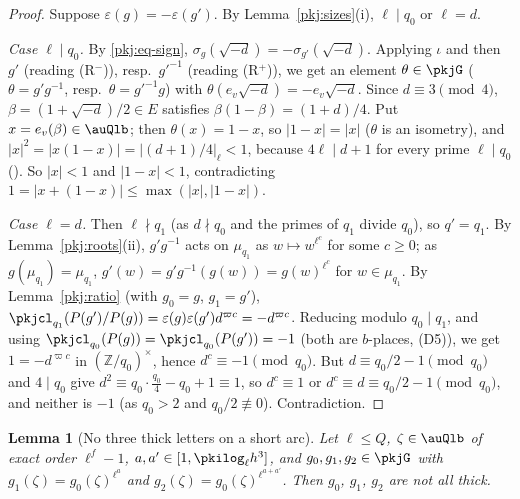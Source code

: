 \documentclass[10pt]{amsart}
\newtheorem{lemma}[theorem]{Lemma}
\theoremstyle{definition}
\theoremstyle{remark}
\newcommand{\Z}{\mathbb Z}
\begin{document}
\begin{proof}
Suppose $\varepsilon(g)=-\varepsilon(g')$. By Lemma~\ref{pkj:sizes}(i), $\ell\mid q_0$ or $\ell=d$.

\emph{Case $\ell\mid q_0$.} By \eqref{pkj:eq-sign}, $\sigma_g(\sqrt{-d})=-\sigma_{g'}(\sqrt{-d})$. Applying
$\iota$ and then $g'$ (reading (R$^-$)), resp.\ $g'^{-1}$ (reading (R$^+$)), we get an element
$\theta\in\pkjG$ ($\theta=g'g^{-1}$, resp.\ $\theta=g'^{-1}g$) with $\theta(e_v\sqrt{-d})=-e_v\sqrt{-d}$. Since $d\equiv3
\pmod4$, $\beta=(1+\sqrt{-d})/2\in E$ satisfies $\beta(1-\beta)=(1+d)/4$. Put $x=e_v(\beta)\in\auQlb$;
then $\theta(x)=1-x$, so $|1-x|=|x|$ ($\theta$ is an isometry), and
$|x|^2=|x(1-x)|=|(d+1)/4|_\ell<1$, because $4\ell\mid d+1$ for every prime $\ell\mid q_0$
({\cite[\S13.1]{P46}}). So $|x|<1$ and $|1-x|<1$, contradicting $1=|x+(1-x)|\le\max(|x|,|1-x|)$.

\emph{Case $\ell=d$.} Then $\ell\nmid q_1$ (as $d\nmid q_0$ and the primes of $q_1$ divide $q_0$), so
$q'=q_1$. By Lemma~\ref{pkj:roots}(ii), $g'g^{-1}$ acts on $\mu_{q_1}$ as $w\mapsto w^{\ell^c}$ for some
$c\ge0$; as $g(\mu_{q_1})=\mu_{q_1}$, $g'(w)=g'g^{-1}(g(w))=g(w)^{\ell^c}$ for $w\in\mu_{q_1}$. By
Lemma~\ref{pkj:ratio} (with $g_0=g$, $g_1=g'$), $\pkjcl_{q_1}(P(g')/P(g))=\varepsilon(g)\varepsilon(g')
d^{\varpi c}=-d^{\varpi c}$. Reducing modulo $q_0\mid q_1$, and using $\pkjcl_{q_0}(P(g))=\pkjcl_{q_0}(P(g'))
=-1$ (both are $b$-places, (D5)), we get $1=-d^{\varpi c}$ in $(\Z/q_0)^\times$, hence $d^{c}\equiv-1
\pmod{q_0}$. But $d\equiv q_0/2-1\pmod{q_0}$ and $4\mid q_0$ give $d^2\equiv q_0\cdot\frac{q_0}4-q_0+1
\equiv1$, so $d^c\equiv1$ or $d^c\equiv d\equiv q_0/2-1\pmod{q_0}$, and neither is $-1$ (as $q_0>2$ and
$q_0/2\not\equiv0$). Contradiction.
\end{proof}

\begin{lemma}[No three thick letters on a short arc]\label{pkj:arc}
Let $\ell\le Q$, $\zeta\in\auQlb$ of exact order $\ell^f-1$, $a,a'\in[1,\pkilog_\ell h^3]$, and
$g_0,g_1,g_2\in\pkjG$ with $g_1(\zeta)=g_0(\zeta)^{\ell^a}$ and $g_2(\zeta)=g_0(\zeta)^{\ell^{a+a'}}$. Then
$g_0$, $g_1$, $g_2$ are not all thick.
\end{lemma}
\end{document}
